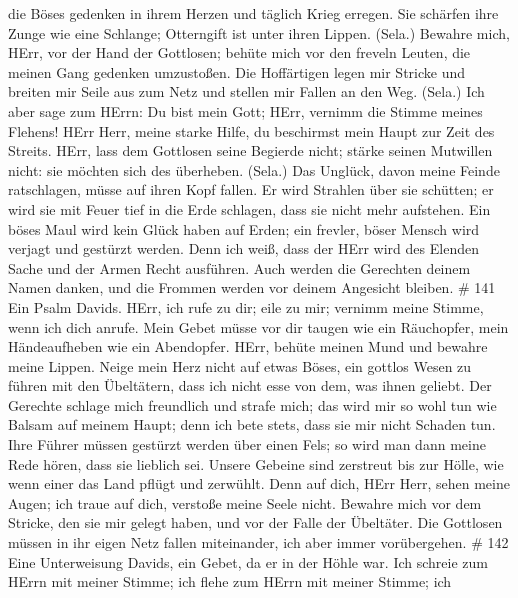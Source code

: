  die Böses gedenken in ihrem Herzen und täglich Krieg
erregen.  Sie schärfen ihre Zunge wie eine Schlange;
Otterngift ist unter ihren Lippen. (Sela.)  Bewahre mich,
HErr, vor der Hand der Gottlosen; behüte mich vor den freveln Leuten,
die meinen Gang gedenken umzustoßen.  Die Hoffärtigen legen
mir Stricke und breiten mir Seile aus zum Netz und stellen mir Fallen an
den Weg. (Sela.)  Ich aber sage zum HErrn: Du bist mein
Gott; HErr, vernimm die Stimme meines Flehens!  HErr Herr,
meine starke Hilfe, du beschirmst mein Haupt zur Zeit des Streits.
 HErr, lass dem Gottlosen seine Begierde nicht; stärke
seinen Mutwillen nicht: sie möchten sich des überheben. (Sela.)
 Das Unglück, davon meine Feinde ratschlagen, müsse auf
ihren Kopf fallen.  Er wird Strahlen über sie schütten; er
wird sie mit Feuer tief in die Erde schlagen, dass sie nicht mehr
aufstehen.  Ein böses Maul wird kein Glück haben auf Erden;
ein frevler, böser Mensch wird verjagt und gestürzt werden.
 Denn ich weiß, dass der HErr wird des Elenden Sache und
der Armen Recht ausführen.  Auch werden die Gerechten
deinem Namen danken, und die Frommen werden vor deinem Angesicht
bleiben. \# 141  Ein Psalm Davids. HErr, ich rufe zu dir;
eile zu mir; vernimm meine Stimme, wenn ich dich anrufe. 
Mein Gebet müsse vor dir taugen wie ein Räuchopfer, mein Händeaufheben
wie ein Abendopfer.  HErr, behüte meinen Mund und bewahre
meine Lippen.  Neige mein Herz nicht auf etwas Böses, ein
gottlos Wesen zu führen mit den Übeltätern, dass ich nicht esse von dem,
was ihnen geliebt.  Der Gerechte schlage mich freundlich und
strafe mich; das wird mir so wohl tun wie Balsam auf meinem Haupt; denn
ich bete stets, dass sie mir nicht Schaden tun.  Ihre Führer
müssen gestürzt werden über einen Fels; so wird man dann meine Rede
hören, dass sie lieblich sei.  Unsere Gebeine sind zerstreut
bis zur Hölle, wie wenn einer das Land pflügt und zerwühlt. 
Denn auf dich, HErr Herr, sehen meine Augen; ich traue auf dich,
verstoße meine Seele nicht.  Bewahre mich vor dem Stricke,
den sie mir gelegt haben, und vor der Falle der Übeltäter. 
Die Gottlosen müssen in ihr eigen Netz fallen miteinander, ich aber
immer vorübergehen. \# 142  Eine Unterweisung Davids, ein
Gebet, da er in der Höhle war.  Ich schreie zum HErrn mit
meiner Stimme; ich flehe zum HErrn mit meiner Stimme;  ich
